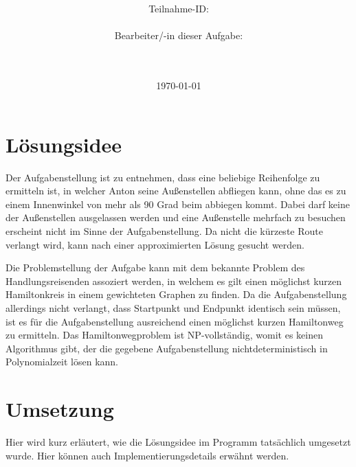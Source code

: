 \documentclass[a4paper,10pt,ngerman]{scrartcl}
\title{\textbf{\Huge\Aufgabe}}
\author{\LARGE Teilnahme-ID: \LARGE \TeilnahmeId \\\\
\LARGE Bearbeiter/-in dieser Aufgabe: \\
\LARGE \Name\\\\}
\date{\LARGE\today}
\begin{document}
    \maketitle
    \tableofcontents
    \vspace{0.5cm}
    \newpage
    
    \section{Lösungsidee}\label{sec:losungsidee}
    
    Der Aufgabenstellung ist zu entnehmen, dass eine beliebige Reihenfolge zu ermitteln ist, 
    in welcher Anton seine Außenstellen abfliegen kann, 
    ohne das es zu einem Innenwinkel von mehr als 90 Grad beim abbiegen kommt.
    Dabei darf keine der Außenstellen ausgelassen werden 
    und eine Außenstelle mehrfach zu besuchen erscheint nicht im Sinne der Aufgabenstellung.
    Da nicht die kürzeste Route verlangt wird, kann nach einer approximierten Lösung gesucht werden.
    
    Die Problemstellung der Aufgabe kann mit dem bekannte Problem des Handlungsreisenden assoziert werden,
    in welchem es gilt einen möglichst kurzen Hamiltonkreis in einem gewichteten Graphen zu finden.
    Da die Aufgabenstellung allerdings nicht verlangt, dass Startpunkt und Endpunkt identisch sein müssen, 
    ist es für die Aufgabenstellung ausreichend einen möglichst kurzen Hamiltonweg zu ermitteln.
    Das Hamiltonwegproblem ist NP-vollständig, womit es keinen Algorithmus gibt, 
    der die gegebene Aufgabenstellung nichtdeterministisch in Polynomialzeit lösen kann.
    
    
    
    
    

    \newpage
    \section{Umsetzung}\label{sec:umsetzung}
    Hier wird kurz erläutert, wie die Lösungsidee im Programm tatsächlich umgesetzt wurde.
    Hier können auch Implementierungsdetails erwähnt werden.
\end{document}
